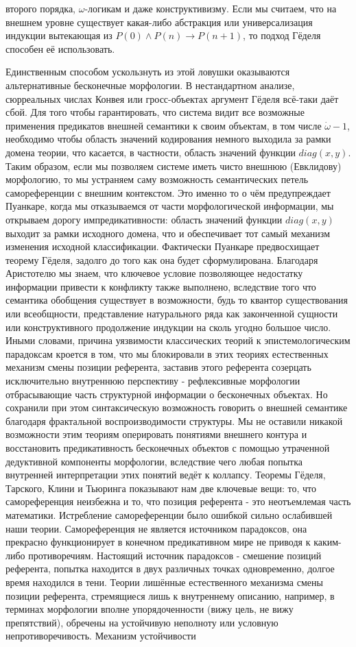 \documentclass[12pt]{article}
\begin{document}
второго порядка, $\omega$-логикам и даже конструктивизму. Если мы считаем, что на внешнем уровне существует какая-либо абстракция или универсализация индукции вытекающая из $P(0) \wedge P(n) \to P(n + 1)$, то подход Гёделя способен её использовать. 

Единственным способом ускользнуть из этой ловушки оказываются альтернативные бесконечные морфологии. В нестандартном анализе, сюрреальных числах Конвея или гросс-объектах аргумент Гёделя всё-таки даёт сбой. Для того чтобы гарантировать, что система видит все возможные применения предикатов внешней семантики к своим объектам, в том числе $\dot{\omega} - 1$, необходимо чтобы область значений кодирования немного выходила за рамки домена теории, что касается, в частности, область значений функции $diag(x, y)$. Таким образом, если мы позволяем системе иметь чисто внешнюю (Евклидову) морфологию, то мы устраняем саму возможность семантических петель самореференции с внешним контекстом. Это именно то о чём предупреждает Пуанкаре, когда мы отказываемся от части морфологической информации, мы открываем дорогу импредикативности: область значений функции $diag(x, y)$ выходит за рамки исходного домена, что и обеспечивает тот самый механизм изменения исходной классификации. Фактически Пуанкаре предвосхищает теорему Гёделя, задолго до того как она будет сформулирована. Благодаря Аристотелю мы знаем, что ключевое условие позволяющее недостатку информации привести к конфликту также выполнено, вследствие того что семантика обобщения существует в возможности, будь то квантор существования или всеобщности, представление натурального ряда как законченной сущности или конструктивного продолжение индукции на сколь угодно большое число. Иными словами, причина уязвимости классических теорий к эпистемологическим парадоксам кроется в том, что мы блокировали в этих теориях естественных механизм смены позиции референта, заставив этого референта созерцать исключительно внутреннюю перспективу - рефлексивные морфологии отбрасывающие часть структурной информации о бесконечных объектах. Но сохранили при этом синтаксическую возможность говорить о внешней семантике благодаря фрактальной воспроизводимости структуры. Мы не оставили никакой возможности этим теориям оперировать понятиями внешнего контура и восстановить предикативность бесконечных объектов с помощью утраченной дедуктивной компоненты морфологии, вследствие чего любая попытка внутренней интерпретации этих понятий ведёт к коллапсу. Теоремы Гёделя, Тарского, Клини и Тьюринга показывают нам две ключевые вещи: то, что самореференция неизбежна и то, что позиция референта - это неотъемлемая часть математики. Истребление самореференции было ошибкой сильно ослабившей наши теории. Самореференция не является источником парадоксов, она прекрасно функционирует в конечном предикативном мире не приводя к каким-либо противоречиям. Настоящий источник парадоксов - смешение позиций референта, попытка находится в двух различных точках одновременно, долгое время находился в тени. Теории лишённые естественного механизма смены позиции референта, стремящиеся лишь к внутреннему описанию, например, в терминах морфологии вполне упорядоченности (вижу цель, не вижу препятствий), обречены на устойчивую неполноту или условную непротиворечивость. Механизм устойчивости 
\end{document}
